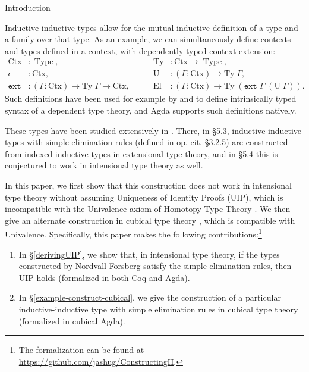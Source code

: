 \documentclass[runningheads]{llncs}
\DeclareMathOperator{\USet}{Type}
\newcommand{\join}{\texttt{ext}}
\def\Forsberg/{Nordvall Forsberg}
\begin{document}
\begin{section}{Introduction}
    
Inductive-inductive types allow for the mutual inductive definition of a type and a family over that type. As an example,
we can simultaneously define contexts and types defined in a context, with dependently typed context extension:
\begin{align*}
\text{Ctx} &: \USet,\qquad
&\text{Ty} &: \text{Ctx} \to \USet,\\
\epsilon &: \text{Ctx},\qquad
&\text{U} &: (\Gamma : \text{Ctx}) \to \text{Ty}\;\Gamma,\\
\join &: (\Gamma : \text{Ctx}) \to \text{Ty}\; \Gamma \to \text{Ctx},\qquad
&\text{El} &: (\Gamma : \text{Ctx}) \to \text{Ty}\;(\join\;\Gamma\;(\text{U}\;\Gamma)).
\end{align*}
Such definitions have been used for example by \citet{danielssonIRdeptype} and \citet{CHAPMAN200921} to define intrinsically typed syntax of a dependent type theory, and Agda supports such definitions natively.

These types have been studied extensively in \citet{nordvallforsberg2013thesis}. There, in \S5.3, inductive-inductive types with simple elimination rules (defined in op. cit. \S3.2.5) are constructed from indexed inductive types in extensional type theory, and in \S5.4 this is conjectured to work in intensional type theory as well.

In this paper, we first show that this construction does not work in intensional type theory without assuming Uniqueness of Identity Proofs (UIP), which is incompatible with the Univalence axiom of Homotopy Type Theory \citep{hottbook}. We then give an alternate construction in cubical type theory \citep{cubicaltt_ifcolog}, which is compatible with Univalence.
Specifically, this paper makes the following contributions:\footnote{The formalization can be found at \url{https://github.com/jashug/ConstructingII}.}
\begin{enumerate}
    \item In \S\ref{derivingUIP}, we show that, in intensional type theory, if the types constructed by \Forsberg/ satisfy the simple elimination rules, then UIP holds (formalized in both Coq and Agda).
    \item In \S\ref{example-construct-cubical}, we give the construction of a particular inductive-inductive type with simple elimination rules in cubical type theory (formalized in cubical Agda).
\end{enumerate}


\end{section}
\end{document}
